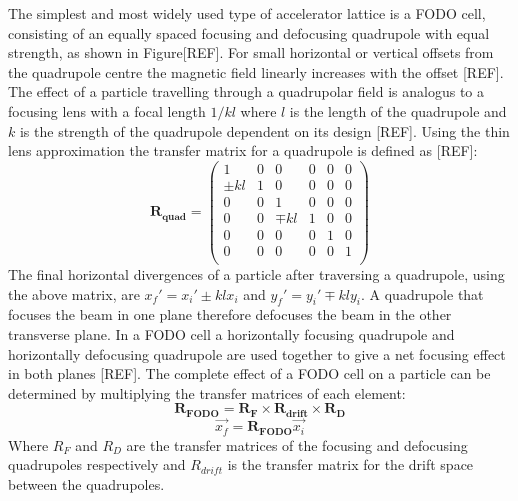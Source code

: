 The simplest and most widely used type of accelerator lattice is a FODO cell, consisting of an equally spaced focusing and defocusing quadrupole with equal strength, as shown in Figure[REF]. For small horizontal or vertical offsets from the quadrupole centre the magnetic field linearly increases with the offset [REF]. The effect of a particle travelling through a quadrupolar field is analogus to a focusing lens with a focal length \(1/kl\) where \(l\) is the length of the quadrupole and \(k\) is the strength of the quadrupole dependent on its design [REF]. Using the thin lens approximation the transfer matrix for a quadrupole is defined as [REF]:
\begin{equation}
\mathbf{R_{quad}}
=
\left( \begin{array}{cccccc} 
1 & 0 & 0 & 0 & 0 & 0\\
\pm kl & 1 & 0 & 0 & 0 & 0 \\
0 & 0 & 1 & 0 & 0 & 0 \\
0 & 0 & \mp kl & 1 & 0 & 0 \\
0 & 0 & 0 & 0 & 1 & 0 \\
0 & 0 & 0 & 0 & 0 & 1 \\
\end{array} \right)
\end{equation}
The final horizontal divergences of a particle after traversing a quadrupole, using the above matrix, are \(x_f' = x_i' \pm klx_i\) and \(y_f' = y_i' \mp kly_i\). A quadrupole that focuses the beam in one plane therefore defocuses the beam in the other transverse plane. In a FODO cell a horizontally focusing quadrupole and horizontally defocusing quadrupole are used together to give a net focusing effect in both planes [REF]. The complete effect of a FODO cell on a particle can be determined by multiplying the transfer matrices of each element:
\begin{equation}
\mathbf{R_{FODO}} = \mathbf{R_{F} \times R_{drift} \times R_{D}}
\end{equation}
\begin{equation}
\vec{x_f} = \mathbf{R_{FODO}}\vec{x_i}
\end{equation}
Where \(R_{F}\) and \(R_{D}\) are the transfer matrices of the focusing and defocusing quadrupoles respectively and \(R_{drift}\) is the transfer matrix for the drift space between the quadrupoles. 

